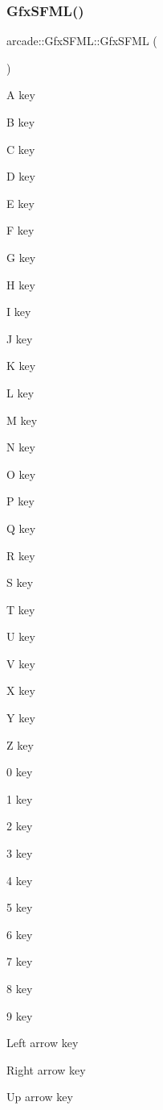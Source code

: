 \mbox{\label{classarcade_1_1_gfx_s_f_m_l_ad7ba5ca3fb9816b283a8603d6d28686f}} 
\subsubsection{\texorpdfstring{Gfx\+S\+F\+M\+L()}{GfxSFML()}}
{\footnotesize\ttfamily arcade\+::\+Gfx\+S\+F\+M\+L\+::\+Gfx\+S\+F\+ML (\begin{DoxyParamCaption}{ }\end{DoxyParamCaption})}

A key

B key

C key

D key

E key

F key

G key

H key

I key

J key

K key

L key

M key

N key

O key

P key

Q key

R key

S key

T key

U key

V key

X key

Y key

Z key

0 key

1 key

2 key

3 key

4 key

5 key

6 key

7 key

8 key

9 key

Left arrow key

Right arrow key

Up arrow key

